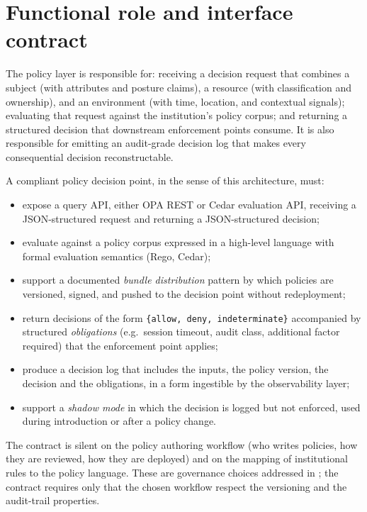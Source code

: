 \section{Functional role and interface contract}
\label{sec:po-contract}

The policy layer is responsible for: receiving a decision request
that combines a subject (with attributes and posture claims), a
resource (with classification and ownership), and an environment
(with time, location, and contextual signals); evaluating that
request against the institution's policy corpus; and returning a
structured decision that downstream enforcement points consume. It
is also responsible for emitting an audit-grade decision log that
makes every consequential decision reconstructable.

\begin{contractbox}
\noindent A compliant policy decision point, in the sense of this
architecture, must:

\begin{itemize}[leftmargin=1.5em,nosep]
  \item expose a query API, either OPA REST or Cedar evaluation API,
    receiving a JSON-structured request and returning a JSON-structured
    decision;
  \item evaluate against a policy corpus expressed in a high-level
    language with formal evaluation semantics (Rego, Cedar);
  \item support a documented \emph{bundle distribution} pattern by
    which policies are versioned, signed, and pushed to the decision
    point without redeployment;
  \item return decisions of the form
    \texttt{\{allow, deny, indeterminate\}} accompanied by structured
    \emph{obligations} (e.g.\ session timeout, audit class, additional
    factor required) that the enforcement point applies;
  \item produce a decision log that includes the inputs, the policy
    version, the decision and the obligations, in a form ingestible
    by the observability layer;
  \item support a \emph{shadow mode} in which the decision is logged
    but not enforced, used during introduction or after a policy
    change.
\end{itemize}
\end{contractbox}

The contract is silent on the policy authoring workflow (who writes
policies, how they are reviewed, how they are deployed) and on the
mapping of institutional rules to the policy language. These are
governance choices addressed in ; the
contract requires only that the chosen workflow respect the
versioning and the audit-trail properties.

